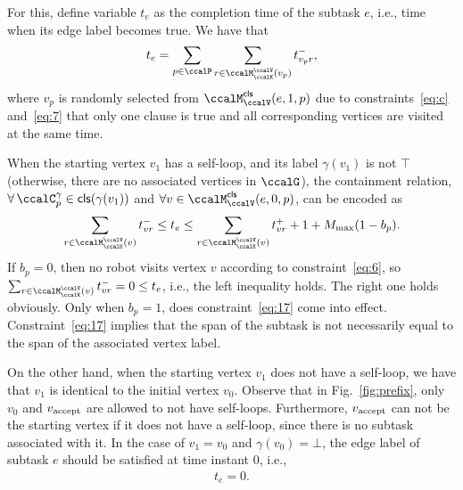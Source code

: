 \documentclass[Afour,sageh,times]{sagej}
\newcommand{\clause}[1]{\mathsf{cls}(#1)}
\newcommand{\vertex}[1]{v_{\textup{#1}}}
\begin{document}
{{{For this, define variable  $t_e$ as the completion time of the subtask $e$, i.e., time when its edge label  becomes true. We have  that
\begingroup\makeatletter\def\f@size{10}\check@mathfonts
\def\maketag@@@#1{\hbox{\m@th\normalsize\normalfont#1}}%
\begin{align}\label{eq:edgetime}
  t_e = \sum_{p\in \ccalP} \sum_{r\in \ccalM^\ccalV_{\ccalK}(v_p)}t_{v_p r}^-,
\end{align}
\endgroup
where $v_p$ is randomly selected from $\ccalM^\mathsf{cls}_\ccalV(e,1,p)$ due to constraints~\eqref{eq:c} and~\eqref{eq:7} that only one clause is true and all corresponding vertices are visited at the same time.

When the starting vertex $v_1$ has a self-loop, and its label $\gamma(v_1)$ is not  $\top$ (otherwise, there are no associated vertices in $\ccalG$), the containment relation, $\forall\, \ccalC_p^{\gamma} \in \clause{\gamma(v_1)}$ and $\forall v \in \ccalM^\mathsf{cls}_\ccalV(e,0,p)$, can be encoded as
\begingroup\makeatletter\def\f@size{10}\check@mathfonts
\def\maketag@@@#1{\hbox{\m@th\normalsize\normalfont#1}}%
  \begin{align}
 \sum_{r\in \ccalM^\ccalV_{\ccalK}(v)} t_{vr}^-  \leq  t_e \leq
    \sum_{r\in \ccalM^\ccalV_{\ccalK}(v)} t_{vr}^+ + 1  + M_{\text{max}} (1 - b_{p}). \label{eq:17}
  \end{align}
  \endgroup
  If $b_p=0$, then no robot visits vertex $v$ according to constraint~\eqref{eq:6}, so~ $ \sum_{r\in \ccalM^\ccalV_{\ccalK}(v)} t_{vr}^- = 0 \leq t_e$, i.e., the left inequality holds. The right one holds obviously. Only when $b_p=1$, does constraint~\eqref{eq:17} come into effect. Constraint~\eqref{eq:17} implies that the span of the subtask is not necessarily equal to the span of the associated vertex label.

  On the other hand, when the starting vertex $v_1$ does not have a self-loop, we have that $v_1$ is identical to the initial vertex $v_0$. Observe that in Fig.~\ref{fig:prefix}, only $v_0$ and $\vertex{accept}$ are allowed to not have self-loops. Furthermore, $\vertex{accept}$ can not be the starting vertex if it does not have a self-loop, since there is no subtask associated with it. In the case of $v_1 = v_0$ and $\gamma(v_0) = \bot$, the edge label of subtask $e$ should be satisfied at time instant 0, i.e.,
  \begingroup\makeatletter\def\f@size{10}\check@mathfonts
\def\maketag@@@#1{\hbox{\m@th\normalsize\normalfont#1}}%
  \begin{align}
 t_e = 0. \label{eq:tis0}
  \end{align}
  \endgroup


}}}
\end{document}
